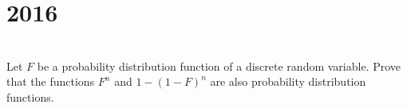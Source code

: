 \section*{2016}
\vspace{-.5cm}
\hrulefill \smallskip\\
 Let $F$ be a probability distribution function of a discrete random variable. Prove that the functions $F^n$ and $1 - (1 - F)^n$ are also probability distribution functions.
\myline
